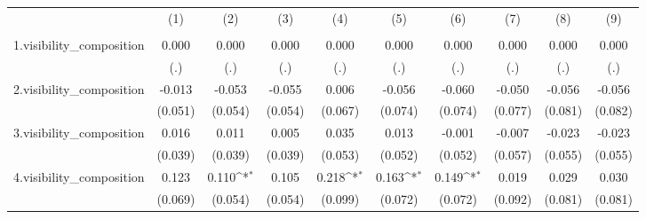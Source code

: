 {
\def\sym#1{\ifmmode^{#1}\else\(^{#1}\)\fi}
\begin{tabular}{l*{9}{c}}
\hline\hline
            &\multicolumn{1}{c}{(1)}&\multicolumn{1}{c}{(2)}&\multicolumn{1}{c}{(3)}&\multicolumn{1}{c}{(4)}&\multicolumn{1}{c}{(5)}&\multicolumn{1}{c}{(6)}&\multicolumn{1}{c}{(7)}&\multicolumn{1}{c}{(8)}&\multicolumn{1}{c}{(9)}\\
            &\multicolumn{1}{c}{} &\multicolumn{1}{c}{} &\multicolumn{1}{c}{} &\multicolumn{1}{c}{} &\multicolumn{1}{c}{} &\multicolumn{1}{c}{} &\multicolumn{1}{c}{} &\multicolumn{1}{c}{} &\multicolumn{1}{c}{} \\
\hline
1.visibility\_composition&       0.000         &       0.000         &       0.000         &       0.000         &       0.000         &       0.000         &       0.000         &       0.000         &       0.000         \\
            &         (.)         &         (.)         &         (.)         &         (.)         &         (.)         &         (.)         &         (.)         &         (.)         &         (.)         \\
[1em]
2.visibility\_composition&      -0.013         &      -0.053         &      -0.055         &       0.006         &      -0.056         &      -0.060         &      -0.050         &      -0.056         &      -0.056         \\
            &     (0.051)         &     (0.054)         &     (0.054)         &     (0.067)         &     (0.074)         &     (0.074)         &     (0.077)         &     (0.081)         &     (0.082)         \\
[1em]
3.visibility\_composition&       0.016         &       0.011         &       0.005         &       0.035         &       0.013         &      -0.001         &      -0.007         &      -0.023         &      -0.023         \\
            &     (0.039)         &     (0.039)         &     (0.039)         &     (0.053)         &     (0.052)         &     (0.052)         &     (0.057)         &     (0.055)         &     (0.055)         \\
[1em]
4.visibility\_composition&       0.123         &       0.110\sym{*}  &       0.105         &       0.218\sym{*}  &       0.163\sym{*}  &       0.149\sym{*}  &       0.019         &       0.029         &       0.030         \\
            &     (0.069)         &     (0.054)         &     (0.054)         &     (0.099)         &     (0.072)         &     (0.072)         &     (0.092)         &     (0.081)         &     (0.081)         \\

\end{tabular}}
